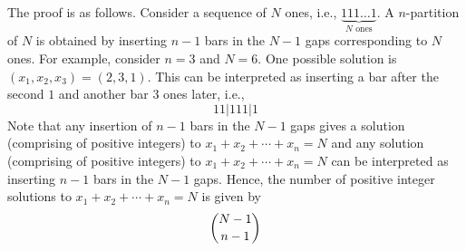 \documentclass{article}
\begin{document}
\begin{enumerate}
{		The proof is as follows. Consider a sequence of $N$ ones, i.e., $\underbrace{111 \ldots 1}_{N \text{ ones}}$. A $n$-partition of $N$ is obtained by inserting $n-1$ bars in the $N-1$ gaps corresponding to $N$ ones. For example, consider $n=3$ and $N=6$. One possible solution is $(x_1,x_2,x_3) = (2,3,1)$. This can be interpreted as inserting a bar after the second $1$ and another bar $3$ ones later, i.e.,
		$$1 1 \Bigg\vert 1 1 1 \Bigg\vert 1$$
		Note that any insertion of $n-1$ bars in the $N-1$ gaps gives a solution (comprising of positive integers) to $x_1+x_2+\cdots+x_n = N$ and any solution (comprising of positive integers) to $x_1+x_2+\cdots+x_n = N$ can be interpreted as inserting $n-1$ bars in the $N-1$ gaps. Hence, the number of positive integer solutions to $x_1+x_2+\cdots+x_n = N$ is given by
		$$\dbinom{N-1}{n-1}$$
		}
		

\end{enumerate}
\end{document}

